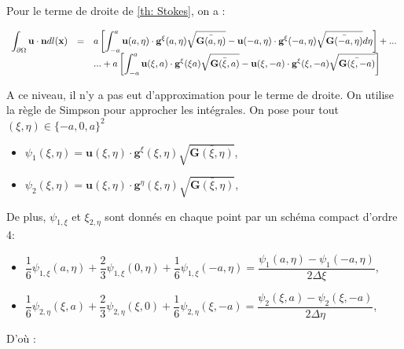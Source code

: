 Pour le terme de droite de \ref{th: Stokes}, on a :

\begin{equation}
\begin{array}{rcl}
\displaystyle\int_{\partial \Omega} \mathbf{u} \cdot \mathbf{n} dl(\mathbf{x}) & = & a \left[ \displaystyle\int_{-a}^a \mathbf{u}(a,\eta) \cdot \mathbf{g}^{\xi} (a, \eta) \sqrt{\bar{\mathbf{G}(a,\eta)}}- \mathbf{u}(-a,\eta) \cdot \mathbf{g}^{\xi} (-a, \eta) \sqrt{\bar{\mathbf{G}(-a,\eta)}} d\eta \right]+ ...\\
&  & ... + a \left[ \displaystyle\int_{-a}^a \mathbf{u}(\xi,a) \cdot \mathbf{g}^{\xi} (\xi a) \sqrt{\bar{\mathbf{G}(\xi,a)}}- \mathbf{u}(\xi,-a) \cdot \mathbf{g}^{\xi} (\xi, -a) \sqrt{\bar{\mathbf{G}(\xi,-a)}}\right]
\end{array}
\label{eq: quadrature simpson L}
\end{equation}

A ce niveau, il n'y a pas eut d'approximation pour le terme de droite. On utilise la règle de Simpson pour approcher les intégrales. On pose pour tout $(\xi, \eta) \in \lbrace -a, 0, a \rbrace^2$

\begin{itemize}
\item $\psi_1(\xi, \eta) = \mathbf{u}(\xi, \eta) \cdot \mathbf{g}^{\xi}(\xi, \eta) \sqrt{\bar{\mathbf{G}(\xi, \eta)}}$,
\item $\psi_2(\xi, \eta) = \mathbf{u}(\xi, \eta) \cdot \mathbf{g}^{\eta}(\xi, \eta) \sqrt{\bar{\mathbf{G}(\xi, \eta)}}$,
\end{itemize}

De plus, $\psi_{1,\xi}$ et $\xi_{2,\eta}$ sont donnés en chaque point par un schéma compact d'ordre 4:

\begin{itemize}
\item $\dfrac{1}{6}\psi_{1,\xi}(a, \eta)+\dfrac{2}{3}\psi_{1,\xi}(0, \eta)+\dfrac{1}{6}\psi_{1,\xi}(-a, \eta) = \dfrac{\psi_1(a,\eta)-\psi_1(-a,\eta)}{2 \Delta \xi}$,
\item $\dfrac{1}{6}\psi_{2,\eta}(\xi,a)+\dfrac{2}{3}\psi_{2,\eta}(\xi,0)+\dfrac{1}{6}\psi_{2,\eta}(\xi,-a) = \dfrac{\psi_2(\xi,a)-\psi_2(\xi,-a)}{2 \Delta \eta}$,
\end{itemize}

D'où :


